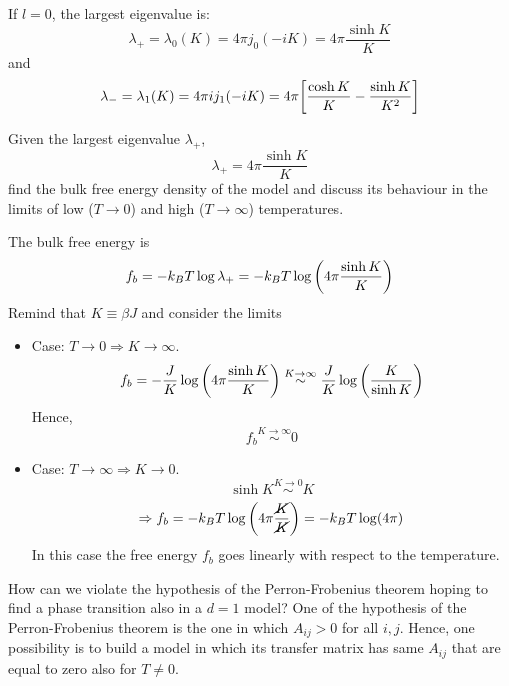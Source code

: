\documentclass[../main/main.tex]{subfiles}
\begin{document}
If \( l=0 \), the largest eigenvalue is:
\begin{equation*}
  \lambda _+ = \lambda _0 (K) = 4 \pi j_0 (-iK) = 4 \pi \frac{\sinh K }{K}
\end{equation*}
and
\begin{equation*}
  \lambda _- = \lambda _1 (K) = 4 \pi i j_1 (-iK) = 4 \pi \qty[\frac{\cosh K }{K}-\frac{\sinh K }{K^2}]
\end{equation*}

\begin{exercise}{}{}
Given the largest eigenvalue \( \lambda _+ \),
\begin{equation*}
  \lambda _+ = 4 \pi \frac{\sinh K }{K}
\end{equation*}
find the bulk free energy density of the model and discuss its behaviour in the limits of low (\( T \rightarrow 0 \)) and high (\( T \rightarrow \infty  \)) temperatures.
\begin{solution}
The bulk free energy is 
\begin{equation*}
    f_b = -k_B T \log \lambda_+ = -k_B T \log \qty(  4 \pi \frac{\sinh K }{K} )
\end{equation*}
Remind that \( K \equiv \beta J \) and consider the limits
\begin{itemize}
    \item Case: \( T \rightarrow 0 \Rightarrow K \rightarrow \infty \).
    \begin{equation*}
       f_b = - \frac{J}{K} \log \qty(  4 \pi \frac{\sinh K }{K} )
        \overset{K \rightarrow \infty}{\sim}
        \frac{J}{K}   \log \qty(  \frac{K}{\sinh K} )
    \end{equation*}    
    Hence,
    \begin{equation*}
       f_b \overset{K \rightarrow \infty}{\sim} 0
    \end{equation*}      
    \item Case: \( T \rightarrow \infty \Rightarrow K \rightarrow 0 \).
    \begin{equation*}
        \sinh K \overset{K \rightarrow 0}{\sim} K
    \end{equation*}
    \begin{equation*}
        \Rightarrow f_b = - k_B T \log \qty(  4 \pi \frac{ \cancel{K} }{\cancel{K}} ) = - k_B T \log (4 \pi)
    \end{equation*}
    In this case the free energy \(f_b\) goes linearly with respect to the temperature.
\end{itemize}

\end{solution}
\end{exercise}


How can we violate the hypothesis of the Perron-Frobenius theorem hoping to find a phase transition also in a \( d=1 \) model?
 One of the hypothesis of the Perron-Frobenius theorem is the one in which \( A_{ij}>0  \) for all \(i,j \). Hence, one possibility is to build a model in which its transfer matrix has same \( A_{ij} \) that are equal to zero also for \( T \neq 0 \).
\end{document}
